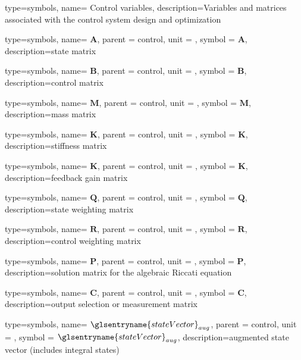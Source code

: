{type=symbols,
    name= {Control variables},
    description={Variables and matrices associated with the control system design and optimization}
}

{type=symbols,
    name= \ensuremath{\mathbf{A}},
    parent = {control},
    unit = \unexpanded{},
    symbol = \ensuremath{\mathbf{A}},
    description={state matrix}
}

{type=symbols,
    name= \ensuremath{\mathbf{B}},
    parent = {control},
    unit = \unexpanded{},
    symbol = \ensuremath{\mathbf{B}},
    description={control matrix}
}

{type=symbols,
    name= \ensuremath{\mathbf{M}},
    parent = {control},
    unit = \unexpanded{},
    symbol = \ensuremath{\mathbf{M}},
    description={mass matrix}
}

{type=symbols,
    name= \ensuremath{\mathbf{K}},
    parent = {control},
    unit = \unexpanded{},
    symbol = \ensuremath{\mathbf{K}},
    description={stiffness matrix}
}

{type=symbols,
    name= \ensuremath{\mathbf{K}},
    parent = {control},
    unit = \unexpanded{},
    symbol = \ensuremath{\mathbf{K}},
    description={feedback gain matrix}
}

{type=symbols,
    name= \ensuremath{\mathbf{Q}},
    parent = {control},
    unit = \unexpanded{},
    symbol = \ensuremath{\mathbf{Q}},
    description={state weighting matrix}
}

{type=symbols,
    name= \ensuremath{\mathbf{R}},
    parent = {control},
    unit = \unexpanded{},
    symbol = \ensuremath{\mathbf{R}},
    description={control weighting matrix}
}

{type=symbols,
    name= \ensuremath{\mathbf{P}},
    parent = {control},
    unit = \unexpanded{},
    symbol = \ensuremath{\mathbf{P}},
    description={solution matrix for the algebraic Riccati equation}
}

{type=symbols,
    name= \ensuremath{\mathbf{C}},
    parent = {control},
    unit = \unexpanded{},
    symbol = \ensuremath{\mathbf{C}},
    description={output selection or measurement matrix}
}

{type=symbols,
    name= \ensuremath{\glsentryname{stateVector}_{aug}},
    parent = {control},
    unit = \unexpanded{},
    symbol = \ensuremath{\glsentryname{stateVector}_{aug}},
    description={augmented state vector (includes integral states)}
}

